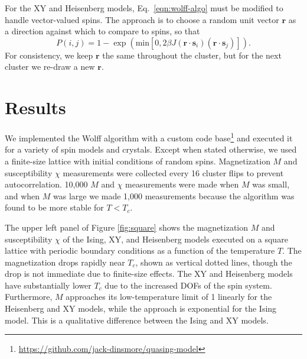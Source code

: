 \documentclass[
  amsmath,
  amssymb,
  aps,
  twocolumn,
  nofootinbib,
  nolongbibliography,
  floatfix,
]{revtex4-2}
\newcommand{\parens}[1]{\left ( #1 \right )}
\begin{document}
For the XY and Heisenberg models, Eq.~\ref{eqn:wolff-algo} must be modified to handle vector-valued spins. The approach is to choose a random unit vector $\bm r$ as a direction against which to compare to spins, so that
\begin{equation}
  P(i,j) = 1 - \exp\parens{\mathrm{min}\left[0, 2\beta J (\bm r \cdot \bm s_i)(\bm r \cdot \bm s_j) \right]}.
\end{equation}
For consistency, we keep $\bm r$ the same throughout the cluster, but for the next cluster we re-draw a new $\bm r$.


\section{Results}
\label{sec:results}

We implemented the Wolff algorithm with a custom code base\footnote{\url{https://github.com/jack-dinsmore/quasing-model}} and executed it for a variety of spin models and crystals. Except when stated otherwise, we used a finite-size lattice with initial conditions of random spins. Magnetization $M$ and susceptibility $\chi$ measurements were collected every 16 cluster flips to prevent autocorrelation. 10,000 $M$ and $\chi$ measurements were made when $M$ was small, and when $M$ was large we made 1,000 measurements because the algorithm was found to be more stable for $T< T_c$.

The upper left panel of Figure \ref{fig:square} shows the magnetization $M$ and susceptibility $\chi$ of the Ising, XY, and Heisenberg models executed on a square lattice with periodic boundary conditions as a function of the temperature $T$. The magnetization drops rapidly near $T_c$, shown as vertical dotted lines, though the drop is not immediate due to finite-size effects. The XY and Heisenberg models have substantially lower $T_c$ due to the increased DOFs of the spin system. Furthermore, $M$ approaches its low-temperature limit of 1 linearly for the Heisenberg and XY models, while the approach is exponential for the Ising model. This is a qualitative difference between the Ising and XY models.
\end{document}
